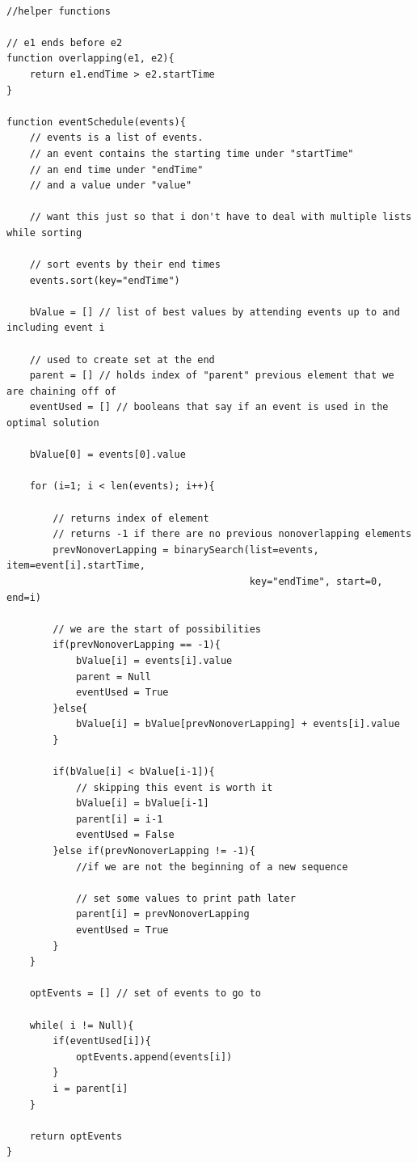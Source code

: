 \documentclass{article}
\begin{document}
\pagebreak
\begin{lstlisting}

//helper functions

// e1 ends before e2
function overlapping(e1, e2){
    return e1.endTime > e2.startTime
}

function eventSchedule(events){
    // events is a list of events.
    // an event contains the starting time under "startTime"
    // an end time under "endTime"
    // and a value under "value"

    // want this just so that i don't have to deal with multiple lists while sorting

    // sort events by their end times
    events.sort(key="endTime")

    bValue = [] // list of best values by attending events up to and including event i

    // used to create set at the end
    parent = [] // holds index of "parent" previous element that we are chaining off of
    eventUsed = [] // booleans that say if an event is used in the optimal solution

    bValue[0] = events[0].value

    for (i=1; i < len(events); i++){

        // returns index of element
        // returns -1 if there are no previous nonoverlapping elements
        prevNonoverLapping = binarySearch(list=events, item=event[i].startTime,
                                          key="endTime", start=0, end=i)

        // we are the start of possibilities
        if(prevNonoverLapping == -1){
            bValue[i] = events[i].value
            parent = Null
            eventUsed = True
        }else{
            bValue[i] = bValue[prevNonoverLapping] + events[i].value
        }

        if(bValue[i] < bValue[i-1]){
            // skipping this event is worth it
            bValue[i] = bValue[i-1]
            parent[i] = i-1
            eventUsed = False
        }else if(prevNonoverLapping != -1){
            //if we are not the beginning of a new sequence

            // set some values to print path later
            parent[i] = prevNonoverLapping
            eventUsed = True
        }
    }

    optEvents = [] // set of events to go to

    while( i != Null){
        if(eventUsed[i]){
            optEvents.append(events[i])
        }
        i = parent[i]
    }

    return optEvents
}

\end{lstlisting}
\end{document}
